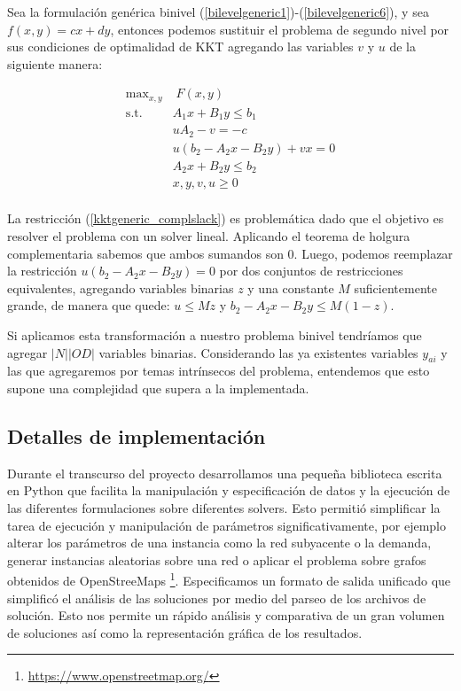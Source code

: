 \documentclass{article}
\begin{document}
  Sea la formulación genérica binivel (\ref{bilevelgeneric1})-(\ref{bilevelgeneric6}), y sea $f(x, y) = cx + dy$, entonces podemos sustituir el problema de segundo nivel por sus condiciones de optimalidad de KKT agregando las variables $v$ y $u$ de la siguiente manera:

  \begin{align}
    \text{max}_{x,y}        & \; F(x, y) \label{kktgeneric1} \\
    \text{s.t.}             & A_1 x + B_1 y \leq b_1 \\
                            & uA_2 - v = -c \\
                            & u(b_2 - A_2x - B_2y) + vx = 0 \label{kktgeneric_complslack} \\
                            & A_2 x + B_2 y \leq b_2 \label{kktgeneric5} \\
                            & x, y, v, u \geq 0 \label{kktgeneric6} \\
  \end{align}

  La restricción (\ref{kktgeneric_complslack}) es problemática dado que el objetivo es resolver el problema con un solver lineal. Aplicando el teorema de holgura complementaria sabemos que ambos sumandos son 0. Luego, podemos reemplazar la restricción $u(b_2 - A_2x - B_2y) = 0$ por dos conjuntos de restricciones equivalentes, agregando variables binarias $z$ y una constante $M$ suficientemente grande, de manera que quede: $u \leq Mz$ y $b_2 - A_2x - B_2y \leq M(1-z)$.

  Si aplicamos esta transformación a nuestro problema binivel tendríamos que agregar $|N| |OD|$ variables binarias. Considerando las ya existentes variables $y_{ai}$ y las que agregaremos por temas intrínsecos del problema, entendemos que esto supone una complejidad que supera a la implementada.

  \subsection{Detalles de implementación}

  Durante el transcurso del proyecto desarrollamos una pequeña biblioteca escrita en Python que facilita la manipulación y especificación de datos y la ejecución de las diferentes formulaciones sobre diferentes solvers. Esto permitió simplificar la tarea de ejecución y manipulación de parámetros significativamente, por ejemplo alterar los parámetros de una instancia como la red subyacente o la demanda, generar instancias aleatorias sobre una red o aplicar el problema sobre grafos obtenidos de OpenStreeMaps \footnote{\url{https://www.openstreetmap.org/}}. Especificamos un formato de salida unificado que simplificó el análisis de las soluciones por medio del parseo de los archivos de solución. Esto nos permite un rápido análisis y comparativa de un gran volumen de soluciones así como la representación gráfica de los resultados.
\end{document}
